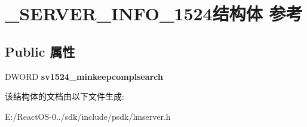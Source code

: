 \hypertarget{struct___s_e_r_v_e_r___i_n_f_o__1524}{}\section{\+\_\+\+S\+E\+R\+V\+E\+R\+\_\+\+I\+N\+F\+O\+\_\+1524结构体 参考}
\label{struct___s_e_r_v_e_r___i_n_f_o__1524}
\subsection*{Public 属性}
\begin{DoxyCompactItemize}
\item 
\mbox{\label{struct___s_e_r_v_e_r___i_n_f_o__1524_a65aa5962dff675be720d49e455b9cddc}} 
D\+W\+O\+RD {\bfseries sv1524\+\_\+minkeepcomplsearch}
\end{DoxyCompactItemize}


该结构体的文档由以下文件生成\+:\begin{DoxyCompactItemize}
\item 
E\+:/\+React\+O\+S-\/0../sdk/include/psdk/lmserver.\+h\end{DoxyCompactItemize}
